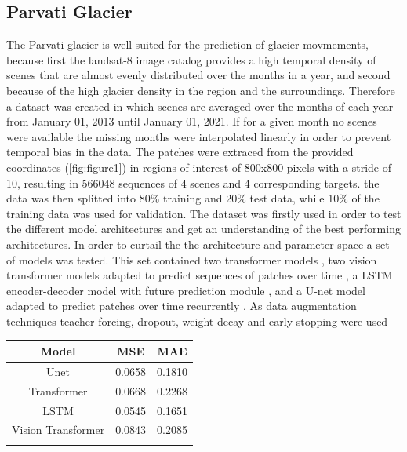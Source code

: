 \documentclass[12pt]{article}
\begin{document}
\subsection{Parvati Glacier}
The Parvati glacier is well suited for the prediction of glacier movmements, because first the landsat-8 image catalog provides a high temporal density of scenes that are almost evenly distributed over the months in a year, and second because of the high glacier density in the region and the surroundings. Therefore a dataset was created in which scenes are averaged over the months of each year from January 01, 2013 until January 01, 2021. If for a given month no scenes were available the missing months were interpolated linearly in order to prevent temporal bias in the data. The patches were extraced from the provided coordinates (\ref{fig:figure1}) in regions of interest of 800x800 pixels with a stride of 10, resulting in 566048 sequences of 4 scenes and 4 corresponding targets. the data was then splitted into 80\% training and 20\% test data, while 10\% of the training data was used for validation. The dataset was firstly used in order to test the different model architectures and get an understanding of the best performing architectures. In order to curtail the the architecture and parameter space a set of models was tested. This set contained two transformer models \citep{vaswani2017attention}, two vision transformer models adapted to predict sequences of patches over time  \citep{dosovitskiy2020image}, a LSTM encoder-decoder model with future prediction module \citep{srivastava2015unsupervised}, and a U-net model adapted to predict patches over time recurrently \citep{ronneberger2015u}. As data augmentation techniques teacher forcing, dropout, weight decay and early stopping were used 



\begin{center}
	\begin{tabular}{|c|c|c|}
		\hline
		Model & MSE & MAE \\
		\hline
		Unet & 0.0658 & 0.1810 \\
		\hline
		Transformer & 0.0668 & 0.2268 \\
		\hline
		LSTM & 0.0545 & 0.1651 \\
		\hline
		Vision Transformer & 0.0843 & 0.2085 \\
		\label{key} \\
		\hline
	\end{tabular}
\end{center}
\end{document}
